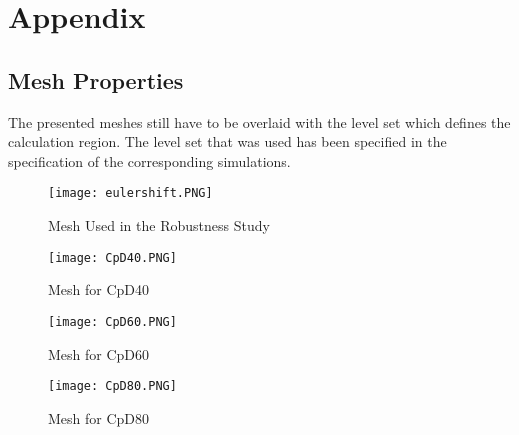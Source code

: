 \appendix
\chapter{Appendix}
\section{Mesh Properties}
The presented meshes still have to be overlaid with the level set which defines the calculation region. The level set that was used has been specified in the specification of the corresponding simulations.
	\begin{figure}[htp]
		\centering
		\texttt{[image: eulershift.PNG]}
		\caption{Mesh Used in the Robustness Study}
		\label{fig:eulershift}
	\end{figure}  
	\begin{figure}[htp]
		\centering
		\texttt{[image: CpD40.PNG]}
		\caption{Mesh for CpD40}
		\label{fig:ms40}
	\end{figure}
	\begin{figure}[htp]
		\centering
		\texttt{[image: CpD60.PNG]}
		\caption{Mesh for CpD60}
		\label{fig:ms60}
	\end{figure} 
	\begin{figure}[htp]
		\centering
		\texttt{[image: CpD80.PNG]}
		\caption{Mesh for CpD80}
		\label{fig:ms80}
	\end{figure}  